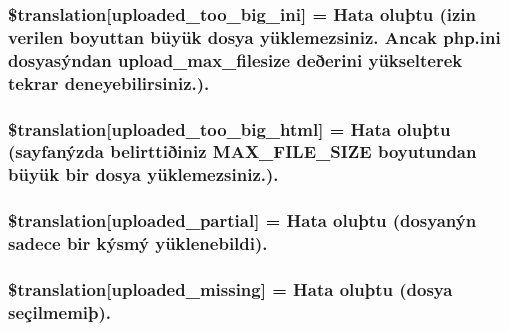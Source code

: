 \subsubsection[{\$translation}]{\setlength{\rightskip}{0pt plus 5cm}\$translation\mbox{[}\textquotesingle{}uploaded\+\_\+too\+\_\+big\+\_\+ini\textquotesingle{}\mbox{]} = \textquotesingle{}Hata oluþtu (izin verilen boyuttan büyük dosya yüklemezsiniz. Ancak php.\+ini dosyasýndan upload\+\_\+max\+\_\+filesize deðerini yükselterek tekrar deneyebilirsiniz.).\textquotesingle{}}\label{class_8upload_8tr___t_r_8php_a6a08dcd0d3651fdd098568f6b2f0a42c}
\hypertarget{class_8upload_8tr___t_r_8php_a623d5b8b92169f57d7e43458aa911cbb}{}
\subsubsection[{\$translation}]{\setlength{\rightskip}{0pt plus 5cm}\$translation\mbox{[}\textquotesingle{}uploaded\+\_\+too\+\_\+big\+\_\+html\textquotesingle{}\mbox{]} = \textquotesingle{}Hata oluþtu (sayfanýzda belirttiðiniz M\+A\+X\+\_\+\+F\+I\+L\+E\+\_\+\+S\+I\+Z\+E boyutundan büyük bir dosya yüklemezsiniz.).\textquotesingle{}}\label{class_8upload_8tr___t_r_8php_a623d5b8b92169f57d7e43458aa911cbb}
\hypertarget{class_8upload_8tr___t_r_8php_a967c17da21b0a2d3bd65cca3a9ca0ea8}{}
\subsubsection[{\$translation}]{\setlength{\rightskip}{0pt plus 5cm}\$translation\mbox{[}\textquotesingle{}uploaded\+\_\+partial\textquotesingle{}\mbox{]} = \textquotesingle{}Hata oluþtu (dosyanýn sadece bir kýsmý yüklenebildi).\textquotesingle{}}\label{class_8upload_8tr___t_r_8php_a967c17da21b0a2d3bd65cca3a9ca0ea8}
\hypertarget{class_8upload_8tr___t_r_8php_a0cce433260be65f1f35853a6b4b8952b}{}
\subsubsection[{\$translation}]{\setlength{\rightskip}{0pt plus 5cm}\$translation\mbox{[}\textquotesingle{}uploaded\+\_\+missing\textquotesingle{}\mbox{]} = \textquotesingle{}Hata oluþtu (dosya seçilmemiþ).\textquotesingle{}}\label{class_8upload_8tr___t_r_8php_a0cce433260be65f1f35853a6b4b8952b}
\hypertarget{class_8upload_8tr___t_r_8php_a4a9168e922b827e6a28b5db1c00774ca}{}

